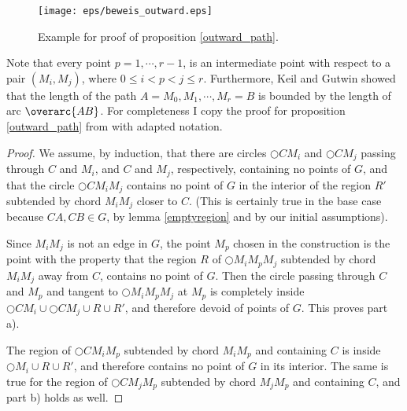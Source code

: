\begin{figure}[h!]
\centering
\texttt{[image: eps/beweis\_outward.eps]}
\caption{Example for proof of proposition \ref{outward_path}.}
\label{fig:outward_path_beweis}
\end{figure}

Note that every point $p=1, \cdots, r-1 $, is an intermediate point with respect to a pair $(M_i, M_j) $, where $0\leq i < p <j \leq r  $.
Furthermore, Keil and Gutwin \cite{keil} showed that the length of the path $A =M_0, M_1, \cdots, M_r=B $ is bounded by the length of arc $\overarc{AB} $.
For completeness I copy the proof for proposition \ref{outward_path} from \cite{kanj} with adapted notation.
\begin{proof}

We assume, by induction, that there are circles $\bigcirc{CM_i} $ and $\bigcirc{CM_j} $ passing through $C $ and $M_i $, and $C $ and $M_j $, respectively, containing no points of $G $, and that the circle $\bigcirc{CM_iM_j} $ contains no point of $G $ in the interior of the region $R' $ subtended by chord $M_iM_j $ closer to $C $.
(This is certainly true in the base case because $CA, CB \in G $, by lemma \ref{emptyregion} and by our initial assumptions).

Since $M_iM_j $ is not an edge in $G $, the point $M_p $ chosen in the construction is the point with the property that the region $R $ of $\bigcirc{M_iM_pM_j} $ subtended by chord $M_iM_j $ away from $C $, contains no point of $G $. 
Then the circle passing through $C $ and $M_p $ and tangent to $\bigcirc{M_iM_pM_j} $ at $M_p $ is completely inside $\bigcirc{CM_i} \cup \bigcirc{CM_j} \cup R \cup R' $, and therefore devoid of points of $G $.
This proves part a).

The region of $\bigcirc{CM_iM_p} $ subtended by chord $M_iM_p $ and containing $C $ is inside $ \bigcirc{M_i} \cup R \cup R' $, and therefore contains no point of $G $ in its interior.
The same is true for the region of $\bigcirc{CM_jM_p} $ subtended by chord $M_jM_p $ and containing $C $, and part b) holds as well.



\end{proof}
